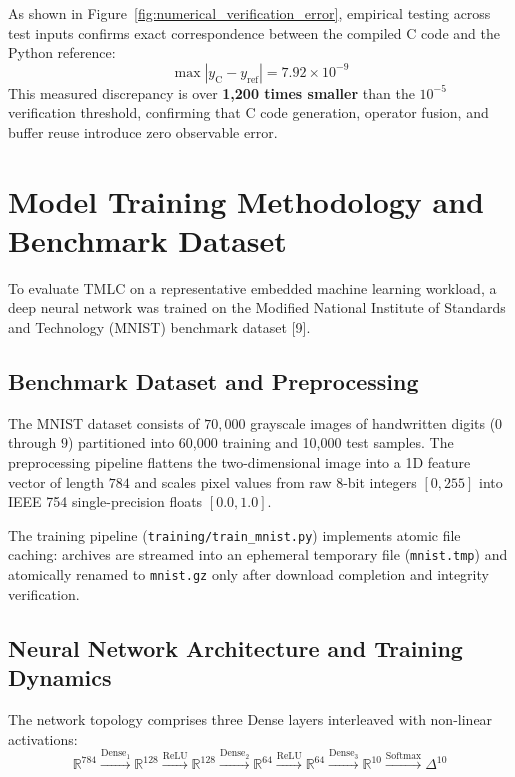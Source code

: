 \documentclass[11pt,a4paper]{article}
\begin{document}
As shown in Figure~\ref{fig:numerical_verification_error}, empirical testing across test inputs confirms exact correspondence between the compiled C code and the Python reference:
$$\max |y_{\text{C}} - y_{\text{ref}}| = 7.92 \times 10^{-9}$$
This measured discrepancy is over \textbf{1,200 times smaller} than the $10^{-5}$ verification threshold, confirming that C code generation, operator fusion, and buffer reuse introduce zero observable error.

\section{Model Training Methodology and Benchmark Dataset}
\label{sec:training}

To evaluate TMLC on a representative embedded machine learning workload, a deep neural network was trained on the Modified National Institute of Standards and Technology (MNIST) benchmark dataset [9].

\subsection{Benchmark Dataset and Preprocessing}
The MNIST dataset consists of $70,000$ grayscale images of handwritten digits ($0$ through $9$) partitioned into 60,000 training and 10,000 test samples. The preprocessing pipeline flattens the two-dimensional image into a 1D feature vector of length $784$ and scales pixel values from raw 8-bit integers $[0, 255]$ into IEEE 754 single-precision floats $[0.0, 1.0]$.

The training pipeline (\texttt{training/train\_mnist.py}) implements atomic file caching: archives are streamed into an ephemeral temporary file (\texttt{mnist.tmp}) and atomically renamed to \texttt{mnist.gz} only after download completion and integrity verification.

\subsection{Neural Network Architecture and Training Dynamics}
The network topology comprises three Dense layers interleaved with non-linear activations:
\begin{equation}
    \mathbb{R}^{784} \xrightarrow{\text{Dense}_1} \mathbb{R}^{128} \xrightarrow{\text{ReLU}} \mathbb{R}^{128} \xrightarrow{\text{Dense}_2} \mathbb{R}^{64} \xrightarrow{\text{ReLU}} \mathbb{R}^{64} \xrightarrow{\text{Dense}_3} \mathbb{R}^{10} \xrightarrow{\text{Softmax}} \Delta^{10}
\end{equation}
\end{document}
